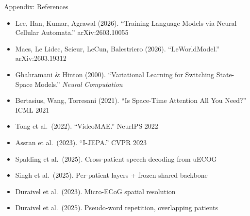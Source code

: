 \documentclass[aspectratio=169, 11pt]{beamer}
\begin{document}
\begin{frame}[noframenumbering]{Appendix: References}

\small
\begin{itemize}
  \item Lee, Han, Kumar, Agrawal (2026). ``Training Language Models via Neural Cellular Automata.'' arXiv:2603.10055
  \item Maes, Le Lidec, Scieur, LeCun, Balestriero (2026). ``LeWorldModel.'' arXiv:2603.19312
  \item Ghahramani \& Hinton (2000). ``Variational Learning for Switching State-Space Models.'' \textit{Neural Computation}
  \item Bertasius, Wang, Torresani (2021). ``Is Space-Time Attention All You Need?'' ICML 2021
  \item Tong et al.\ (2022). ``VideoMAE.'' NeurIPS 2022
  \item Assran et al.\ (2023). ``I-JEPA.'' CVPR 2023
  \item Spalding et al.\ (2025). Cross-patient speech decoding from uECOG
  \item Singh et al.\ (2025). Per-patient layers + frozen shared backbone
  \item Duraivel et al.\ (2023). Micro-ECoG spatial resolution
  \item Duraivel et al.\ (2025). Pseudo-word repetition, overlapping patients
\end{itemize}
\end{frame}
\end{document}
